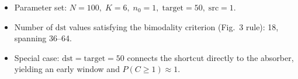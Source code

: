 \begin{itemize}
  \item Parameter set: $N=100,\;K=6,\;n_0=1,\;\mathrm{target}=50,\;\mathrm{src}=1$.
  \item Number of $\mathrm{dst}$ values satisfying the bimodality criterion (Fig.~3 rule): 18, spanning 36--64.
  \item Special case: $\mathrm{dst}=\mathrm{target}=50$ connects the shortcut directly to the absorber, yielding an early window and $P(C\geq 1)\approx 1$.
\end{itemize}

